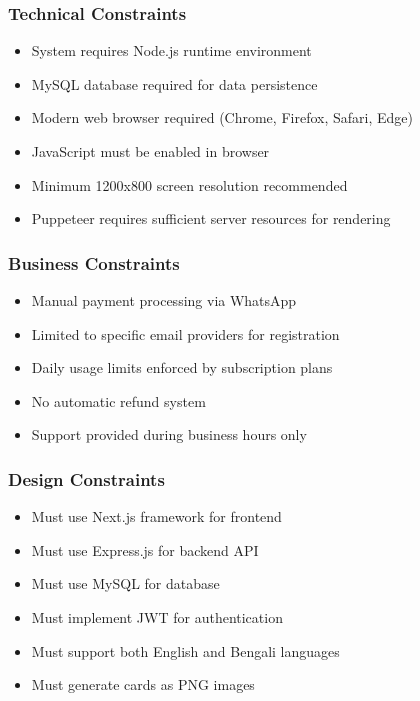 \documentclass[12pt,a4paper]{article}
\begin{document}
\subsubsection{Technical Constraints}
\begin{itemize}
    \item System requires Node.js runtime environment
    \item MySQL database required for data persistence
    \item Modern web browser required (Chrome, Firefox, Safari, Edge)
    \item JavaScript must be enabled in browser
    \item Minimum 1200x800 screen resolution recommended
    \item Puppeteer requires sufficient server resources for rendering
\end{itemize}

\subsubsection{Business Constraints}
\begin{itemize}
    \item Manual payment processing via WhatsApp
    \item Limited to specific email providers for registration
    \item Daily usage limits enforced by subscription plans
    \item No automatic refund system
    \item Support provided during business hours only
\end{itemize}

\subsubsection{Design Constraints}
\begin{itemize}
    \item Must use Next.js framework for frontend
    \item Must use Express.js for backend API
    \item Must use MySQL for database
    \item Must implement JWT for authentication
    \item Must support both English and Bengali languages
    \item Must generate cards as PNG images
\end{itemize}
\end{document}
